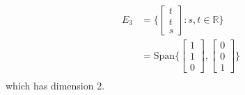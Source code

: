 \documentclass[10pt,a4paper]{article}
\theoremstyle{definition}
\begin{document}
\begin{align*}
E_3 &= \Biggl\{ \begin{bmatrix}
t\\
t\\
s
\end{bmatrix} : s,t \in \mathbb{R} \Biggr\}\\
&= \text{Span} \Biggl\{ \begin{bmatrix}
1\\
1\\
0
\end{bmatrix} , \begin{bmatrix}
0\\
0\\
1
\end{bmatrix} \Biggr\}\\
\end{align*}
which has dimension 2.
\end{document}
